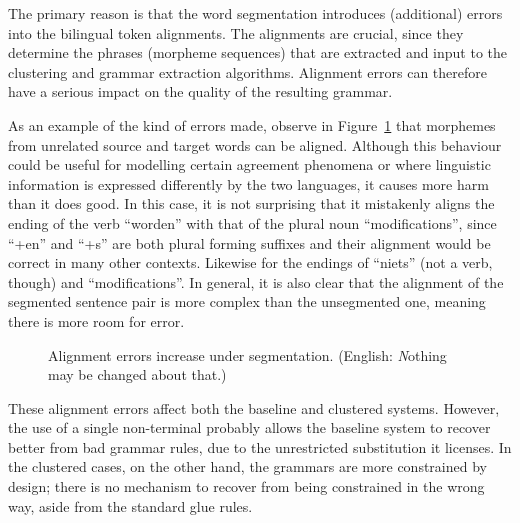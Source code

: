 The primary reason is that the word segmentation introduces (additional) errors into the bilingual token alignments.
The alignments are crucial, since they determine the phrases (morpheme sequences) that are extracted and input to the clustering and grammar extraction algorithms.
Alignment errors can therefore have a serious impact on the quality of the resulting grammar.

As an example of the kind of errors made, observe in Figure~\ref{fig:m_alignment_error} that morphemes from unrelated source and target words can be aligned.
Although this behaviour could be useful for modelling certain agreement phenomena or where linguistic information is expressed differently by the two languages, it causes more harm than it does good. 
In this case, it is not surprising that it mistakenly aligns the ending of the verb ``worden'' with that of the plural noun ``modifications'', since ``+en'' and ``+s'' are both plural forming suffixes and their alignment would be correct in many other contexts.
Likewise for the endings of ``niets'' (not a verb, though) and ``modifications''.
In general, it is also clear that the alignment of the segmented sentence pair is more complex than the unsegmented one, meaning there is more room for error.

\begin{figure}[hb]
  \centering
  \hspace{10mm}
  \caption{Alignment errors increase under segmentation. (English: {\emph Nothing may be changed about that.})}
  \label{fig:m_alignment_error}
\end{figure}

These alignment errors affect both the baseline and clustered systems.
However, the use of a single non-terminal probably allows the baseline system to recover better from bad grammar rules, due to the unrestricted substitution it licenses.
In the clustered cases, on the other hand, the grammars are more constrained by design; there is no mechanism to recover from being constrained in the wrong way, aside from the standard glue rules.

